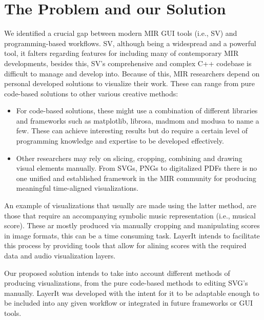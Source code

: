 \section{The Problem and our Solution}
We identified a crucial gap between modern \ac{MIR} \ac{GUI} tools (i.e., \ac{SV}) and programming-based workflows. \ac{SV}, although being a widespread and a powerful tool, it falters regarding features for including many of contemporary \ac{MIR} developments, besides this, \ac{SV}'s comprehensive and complex C++ codebase is difficult to manage and develop into. Because of this, \ac{MIR} researchers depend on personal developed solutions to visualize their work. These can range from pure code-based solutions to other various creative methods:
\begin{itemize}
    \item For code-based solutions, these might use a combination of different libraries and frameworks such as matplotlib, librosa, madmom and modusa to name a few. These can achieve interesting results but do require a certain level of programming knowledge and expertise to be developed effectively. 
    \item Other researchers may rely on slicing, cropping, combining and drawing visual elements manually. From \ac{SVG}s, \ac{PNG}s to digitalized PDFs there is no one unified and established framework in the \ac{MIR} community for producing meaningful time-aligned visualizations. 
\end{itemize}
An example of visualizations that usually are made using the latter method, are those that require an accompanying symbolic music representation (i.e., musical score). These ar mostly produced via manually cropping and manipulating scores in image formats, this can be a time consuming task. LayerIt intends to facilitate this process by providing tools that allow for alining scores with the required data and audio visualization layers.  

Our proposed solution intends to take into account different methods of producing visualizations, from the pure code-based methods to editing \ac{SVG}'s manually. LayerIt was developed with the intent for it to be adaptable enough to be included into any given workflow or integrated in future frameworks or \ac{GUI} tools.

